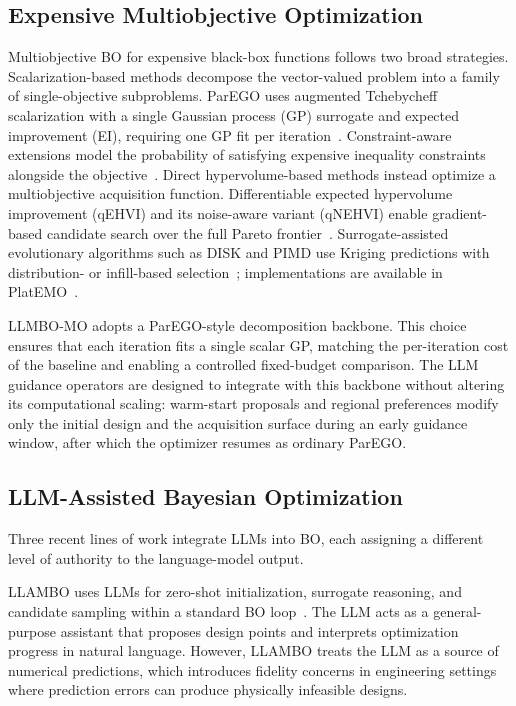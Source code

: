 \subsection{Expensive Multiobjective Optimization}

Multiobjective BO for expensive black-box functions follows two broad
strategies.
Scalarization-based methods decompose the vector-valued problem into a family
of single-objective subproblems.
ParEGO uses augmented Tchebycheff scalarization with a single Gaussian process
(GP) surrogate and expected improvement (EI), requiring one GP fit per
iteration~\cite{ref4}.
Constraint-aware extensions model the probability of satisfying expensive
inequality constraints alongside the objective~\cite{refGardner}.
Direct hypervolume-based methods instead optimize a multiobjective acquisition
function.
Differentiable expected hypervolume improvement (qEHVI) and its noise-aware
variant (qNEHVI) enable gradient-based candidate search over the full Pareto
frontier~\cite{refQEHVI,refQNEHVI}.
Surrogate-assisted evolutionary algorithms such as DISK and PIMD use Kriging
predictions with distribution- or infill-based selection~\cite{refDISK,refPIMD};
implementations are available in PlatEMO~\cite{refPlatEMO}.

LLMBO-MO adopts a ParEGO-style decomposition backbone.
This choice ensures that each iteration fits a single scalar GP, matching the
per-iteration cost of the baseline and enabling a controlled fixed-budget
comparison.
The LLM guidance operators are designed to integrate with this backbone without
altering its computational scaling: warm-start proposals and regional
preferences modify only the initial design and the acquisition surface during
an early guidance window, after which the optimizer resumes as ordinary ParEGO.

\subsection{LLM-Assisted Bayesian Optimization}

Three recent lines of work integrate LLMs into BO, each assigning a different
level of authority to the language-model output.

LLAMBO uses LLMs for zero-shot initialization, surrogate reasoning, and
candidate sampling within a standard BO loop~\cite{ref10}.
The LLM acts as a general-purpose assistant that proposes design points and
interprets optimization progress in natural language.
However, LLAMBO treats the LLM as a source of numerical predictions, which
introduces fidelity concerns in engineering settings where prediction errors
can produce physically infeasible designs.

